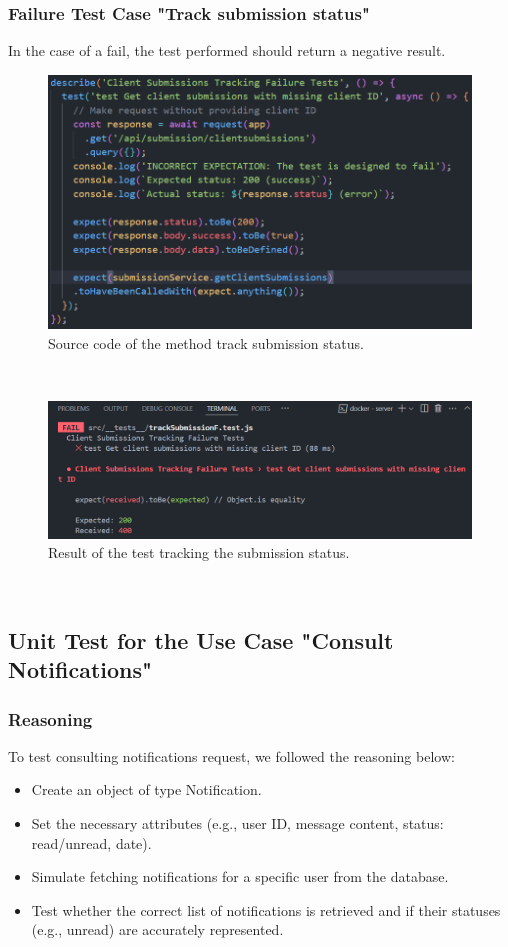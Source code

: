 \subsubsection{Failure Test Case "Track submission status"}
In the case of a fail, the test performed should return a negative result.
\begin{figure}[h!]
    \centering
    \includegraphics[width=1\textwidth]{figures/track subF code.png}
    \caption{Source code of the method track submission status.}
\end{figure} \
\begin{figure}[h!]
    \centering
    \includegraphics[width=1\textwidth]{figures/result tracksubF.png}  
    \caption{Result of the test tracking the submission status.}
\end{figure} \
\clearpage

\subsection{ Unit Test for the Use Case "Consult Notifications"}
\subsubsection{Reasoning}
To test consulting notifications request, we followed the reasoning below:
\begin{itemize}
    \item Create an object of type Notification.
    \item Set the necessary attributes (e.g., user ID, message content, status: read/unread, date).
    \item Simulate fetching notifications for a specific user from the database.
    \item Test whether the correct list of notifications is retrieved and if their statuses (e.g., unread) are accurately represented.
\end{itemize}
